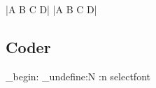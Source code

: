 \CDRCode*|A B C D|
\CDRCode|A B C D|

\egroup

\subsection{Coder}

\ExplSyntaxOn
\group_begin:
\makeatletter
\cs_undefine:N \CDRCode:n
\expandafter\ifx\csname selectfont\endcsname\relax
\else
\fi
